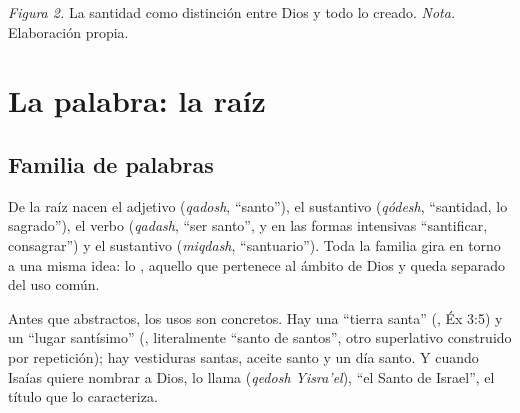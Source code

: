 \begin{center}
\par
{\footnotesize\color{gris}\textit{Figura 2.} La santidad como distinción entre Dios y todo lo creado. \textit{Nota.} Elaboración propia.}
\end{center}

\section{La palabra: la raíz }

\subsection{Familia de palabras}
De la raíz  nacen el adjetivo  (\emph{qadosh}, ``santo''), el sustantivo  (\emph{qódesh}, ``santidad, lo sagrado''), el verbo  (\emph{qadash}, ``ser santo'', y en las formas intensivas ``santificar, consagrar'') y el sustantivo  (\emph{miqdash}, ``santuario''). Toda la familia gira en torno a una misma idea: lo , aquello que pertenece al ámbito de Dios y queda separado del uso común.

Antes que abstractos, los usos son concretos. Hay una ``tierra santa'' (, Éx 3:5) y un ``lugar santísimo'' (, literalmente ``santo de santos'', otro superlativo construido por repetición); hay vestiduras santas, aceite santo y un día santo. Y cuando Isaías quiere nombrar a Dios, lo llama  (\emph{qedosh Yisra'el}), ``el Santo de Israel'', el título que lo caracteriza.

